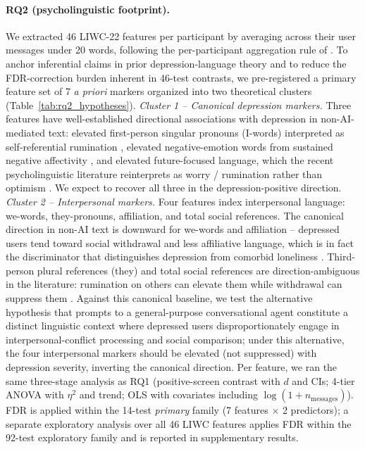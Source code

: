 \documentclass[letterpaper]{article}
\begin{document}
\paragraph{RQ2 (psycholinguistic footprint).} We extracted 46 LIWC-22 features per participant by averaging across their user messages under 20 words, following the per-participant aggregation rule of \citet{anon2026attachment}. To anchor inferential claims in prior depression-language theory and to reduce the FDR-correction burden inherent in 46-test contrasts, we pre-registered a primary feature set of 7 \emph{a priori} markers organized into two theoretical clusters (Table~\ref{tab:rq2_hypotheses}). \emph{Cluster 1 -- Canonical depression markers.} Three features have well-established directional associations with depression in non-AI-mediated text: elevated first-person singular pronouns (I-words) interpreted as self-referential rumination \citep{tackman2019pronouns,edwards2017pronouns}, elevated negative-emotion words from sustained negative affectivity \citep{eichstaedt2018facebook}, and elevated future-focused language, which the recent psycholinguistic literature reinterprets as worry / rumination rather than optimism \citep{thorstad2023future}. We expect to recover all three in the depression-positive direction. \emph{Cluster 2 -- Interpersonal markers.} Four features index interpersonal language: we-words, they-pronouns, affiliation, and total social references. The canonical direction in non-AI text is downward for we-words and affiliation -- depressed users tend toward social withdrawal and less affiliative language, which is in fact the discriminator that distinguishes depression from comorbid loneliness \citep{guntuku2022loneliness,tackman2019pronouns}. Third-person plural references (they) and total social references are direction-ambiguous in the literature: rumination on others can elevate them while withdrawal can suppress them \citep{nolenhoeksema2008rumination}. Against this canonical baseline, we test the alternative hypothesis that prompts to a general-purpose conversational agent constitute a distinct linguistic context where depressed users disproportionately engage in interpersonal-conflict processing and social comparison; under this alternative, the four interpersonal markers should be elevated (not suppressed) with depression severity, inverting the canonical direction. Per feature, we ran the same three-stage analysis as RQ1 (positive-screen contrast with $d$ and CIs; 4-tier ANOVA with $\eta^2$ and trend; OLS with covariates including $\log(1+n_\mathrm{messages})$). FDR is applied within the 14-test \emph{primary} family (7 features $\times$ 2 predictors); a separate exploratory analysis over all 46 LIWC features applies FDR within the 92-test exploratory family and is reported in supplementary results.
\end{document}
